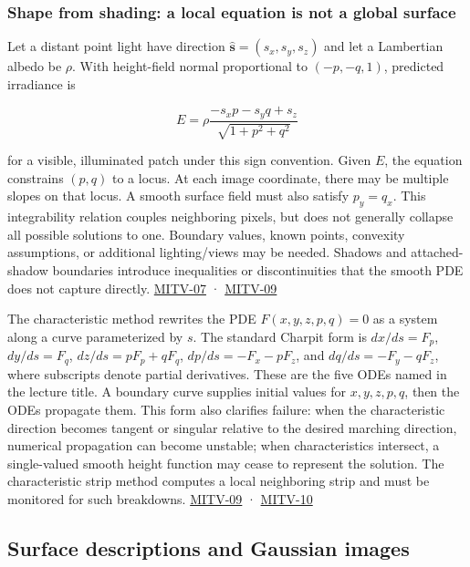\subsubsection{Shape from shading: a local equation is not a global surface}\label{shape-from-shading-a-local-equation-is-not-a-global-surface}

Let a distant point light have direction \(\hat{\mathbf s}=(s_x,s_y,s_z)\) and let a Lambertian albedo be \(\rho\). With height-field normal proportional to \((-p,-q,1)\), predicted irradiance is

\[
E=\rho\frac{-s_xp-s_yq+s_z}{\sqrt{1+p^2+q^2}}
\]

for a visible, illuminated patch under this sign convention. Given \(E\), the equation constrains \((p,q)\) to a locus. At each image coordinate, there may be multiple slopes on that locus. A smooth surface field must also satisfy \(p_y=q_x\). This integrability relation couples neighboring pixels, but does not generally collapse all possible solutions to one. Boundary values, known points, convexity assumptions, or additional lighting/views may be needed. Shadows and attached-shadow boundaries introduce inequalities or discontinuities that the smooth PDE does not capture directly. \hyperref[04-visual-computing-ii-ch036]{MITV-07} · \hyperref[04-visual-computing-ii-ch036]{MITV-09}

The characteristic method rewrites the PDE \(F(x,y,z,p,q)=0\) as a system along a curve parameterized by \(s\). The standard Charpit form is \(dx/ds=F_p\), \(dy/ds=F_q\), \(dz/ds=pF_p+qF_q\), \(dp/ds=-F_x-pF_z\), and \(dq/ds=-F_y-qF_z\), where subscripts denote partial derivatives. These are the five ODEs named in the lecture title. A boundary curve supplies initial values for \(x,y,z,p,q\), then the ODEs propagate them. This form also clarifies failure: when the characteristic direction becomes tangent or singular relative to the desired marching direction, numerical propagation can become unstable; when characteristics intersect, a single-valued smooth height function may cease to represent the solution. The characteristic strip method computes a local neighboring strip and must be monitored for such breakdowns. \hyperref[04-visual-computing-ii-ch036]{MITV-09} · \hyperref[04-visual-computing-ii-ch036]{MITV-10}

\subsection{Surface descriptions and Gaussian images}\label{surface-descriptions-and-gaussian-images}

